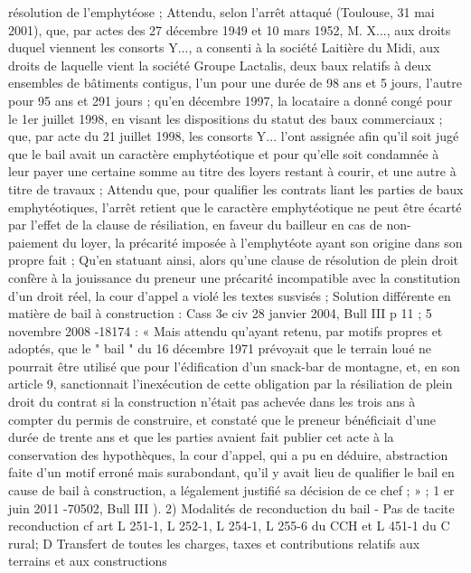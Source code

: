 \documentclass[11pt,a4paper]{report}
\begin{document}
	résolution de l'emphytéose ;
	Attendu, selon l'arrêt attaqué (Toulouse, 31 mai 2001), que, par actes des 27 décembre 1949 et 10 mars 1952,
	M. X..., aux droits duquel viennent les consorts Y..., a consenti à la société Laitière du Midi, aux droits de
	laquelle vient la société Groupe Lactalis, deux baux relatifs à deux ensembles de bâtiments contigus, l'un pour
	une durée de 98 ans et 5 jours, l'autre pour 95 ans et 291 jours ; qu'en décembre 1997, la locataire a donné
	congé pour le 1er juillet 1998, en visant les dispositions du statut des baux commerciaux ; que, par acte du 21
	juillet 1998, les consorts Y... l'ont assignée afin qu'il soit jugé que le bail avait un caractère emphytéotique et
	pour qu'elle soit condamnée à leur payer une certaine somme au titre des loyers restant à courir, et une autre à
	titre de travaux ;
	Attendu que, pour qualifier les contrats liant les parties de baux emphytéotiques, l'arrêt retient que le caractère
	emphytéotique ne peut être écarté par l'effet de la clause de résiliation, en faveur du bailleur en cas de non-
	paiement du loyer, la précarité imposée à l'emphytéote ayant son origine dans son propre fait ;
	Qu'en statuant ainsi, alors qu'une clause de résolution de plein droit confère à la jouissance du preneur une
	précarité incompatible avec la constitution d'un droit réel, la cour d'appel a violé les textes susvisés ;
	Solution différente en matière de bail à construction : Cass 3e civ 28 janvier 2004, Bull III  p 11 ; 5 novembre
	2008 -18174 : « Mais attendu qu'ayant retenu, par motifs propres et adoptés, que le " bail " du 16 décembre
	1971 prévoyait que le terrain loué ne pourrait être utilisé que pour l'édification d'un snack-bar de montagne, et,
	en son article 9, sanctionnait l'inexécution de cette obligation par la résiliation de plein droit du contrat si la
	construction n'était pas achevée dans les trois ans à compter du permis de construire, et constaté que le preneur
	bénéficiait d'une durée de trente ans et que les parties avaient fait publier cet acte à la conservation des
	hypothèques, la cour d'appel, qui a pu en déduire, abstraction faite d'un motif erroné mais surabondant, qu'il y
	avait lieu de qualifier le bail en cause de bail à construction, a légalement justifié sa décision de ce chef ; » ; 1 er
	juin 2011 -70502, Bull III ).
	2) Modalités de reconduction du bail
	- Pas de tacite reconduction cf art L 251-1, L 252-1, L 254-1, L 255-6 du CCH et L 451-1 du C rural;
	D Transfert de toutes les charges, taxes et contributions relatifs aux terrains et aux constructions
\end{document}
